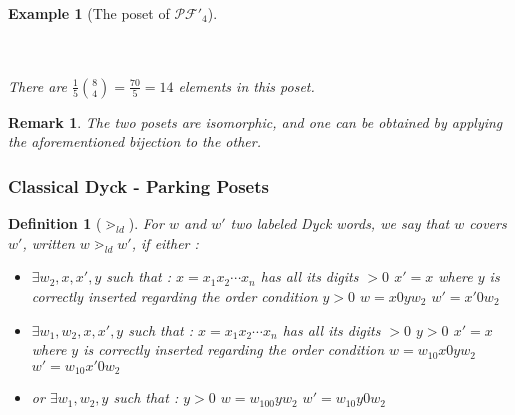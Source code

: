 \documentclass[12pt]{report}
\newtheorem{definition}{Definition}
\newtheorem*{example}{Example}
\newtheorem*{rem}{Remark}
\begin{document}
\begin{example}[The poset of $\mathcal{PF'}_4$]
\begin{center}
\begin{tikzpicture}[scale = 0.3]
        \end{tikzpicture}
        ~\\
        ~\\
        There are $\frac {1}{5} \binom{8}{4} = \frac{70}{5} = 14$
        elements in this poset.
    \end{center}
\end{example}

\begin{rem}
    The two posets are isomorphic, and one can be obtained by
    applying the aforementioned bijection to the other.
\end{rem}

\subsubsection{Classical Dyck - Parking Posets}

\begin{definition}[$\gtrdot_{ld}$]
    For $w$ and $w'$ two labeled Dyck words, we say
    that $w$ covers $w'$, written $w \gtrdot_{ld} w'$,
    if either :
    \begin{itemize}
        \item $\exists w_2, x, x', y$ such that :
            \subitem $x = x_1x_2 \cdots x_n$ has all 
            its digits $> 0$
            \subitem $x' = x$ where $y$ is correctly
            inserted regarding the order condition
            \subitem $y > 0$
            \subitem $w = x0yw_2$
            \subitem $w' = x'0w_2$
        \item $\exists w_1, w_2, x, x', y$ such that :
            \subitem $x = x_1x_2 \cdots x_n$ has all 
                its digits $> 0$
            \subitem $y > 0$
            \subitem $x' = x$ where $y$ is correctly
                inserted regarding the order condition
            \subitem $w = w_10x0yw_2$
            \subitem $w' = w_10x'0w_2$
        \item or $\exists w_1, w_2, y$ such that :
            \subitem $y > 0$
            \subitem $w = w_100yw_2$
            \subitem $w' = w_10y0w_2$
    \end{itemize}  
\end{definition}
\end{document}
